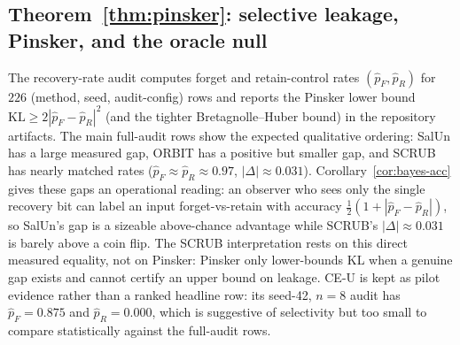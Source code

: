 \documentclass[11pt]{article}
\begin{document}
\subsection{Theorem~\ref{thm:pinsker}: selective leakage, Pinsker, and the oracle null}
The recovery-rate audit computes forget and retain-control rates $(\hat p_F, \hat p_R)$ for $226$ (method, seed, audit-config) rows and reports the Pinsker lower bound $\mathrm{KL} \geq 2|\hat p_F - \hat p_R|^2$ (and the tighter Bretagnolle--Huber bound) in the repository artifacts. The main full-audit rows show the expected qualitative ordering: SalUn has a large measured gap, ORBIT has a positive but smaller gap, and SCRUB has nearly matched rates ($\hat p_F \approx \hat p_R \approx 0.97$, $|\Delta| \approx 0.031$). Corollary~\ref{cor:bayes-acc} gives these gaps an operational reading: an observer who sees only the single recovery bit can label an input forget-vs-retain with accuracy $\tfrac{1}{2}(1+|\hat p_F-\hat p_R|)$, so SalUn's gap is a sizeable above-chance advantage while SCRUB's $|\Delta|\approx0.031$ is barely above a coin flip. The SCRUB interpretation rests on this direct measured equality, not on Pinsker: Pinsker only lower-bounds KL when a genuine gap exists and cannot certify an upper bound on leakage. CE-U is kept as pilot evidence rather than a ranked headline row: its seed-42, $n=8$ audit has $\hat p_F = 0.875$ and $\hat p_R = 0.000$, which is suggestive of selectivity but too small to compare statistically against the full-audit rows.
\end{document}
